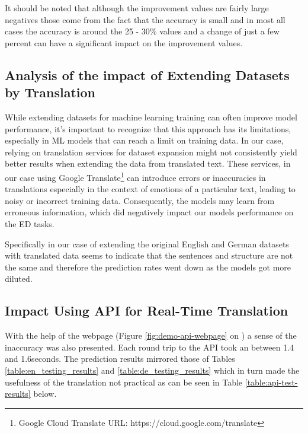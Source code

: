 \documentclass[11pt]{article}
\begin{document}
It should be noted that although the improvement values are fairly large negatives those come from the fact that the accuracy is small and in most all cases the accuracy is around the 25 - 30\% values and a change of just a few percent can have a significant impact on the improvement values.

\subsection{Analysis of the impact of Extending Datasets by Translation}
\label{sec:analysis-of-impact-of-extending-datasets}
While extending datasets for machine learning training can often improve\cite{Sarker2021} model performance, it's important to recognize that this approach has its limitations, especially in ML models that can reach a limit on training data. In our case, relying on translation services for dataset expansion might not consistently yield better results when extending the data from translated text. These services, in our case using Google Translate\footnote{Google Cloud Translate URL: https://cloud.google.com/translate} can introduce errors or inaccuracies in translations especially in the context of emotions of a particular text, leading to noisy or incorrect training data. Consequently, the models may learn from erroneous information, which did negatively impact our models performance on the ED tasks.

Specifically in our case of extending the original English and German datasets with translated data seems to indicate that the sentences and structure are not the same and therefore the prediction rates went down as the models got more diluted.


\subsection{Impact Using API for Real-Time Translation}
\label{sec:impact-using-api-for-real-time-translation}
With the help of the webpage (Figure \ref{fig:demo-api-webpage} on \pageref{fig:demo-api-webpage}) a sense of the inaccuracy was also presented. Each round trip to the API took an between 1.4 and 1.6seconds. The prediction results mirrored those of Tables \ref{table:en_testing_results} and \ref{table:de_testing_results} which in turn made the usefulness of the translation not practical as can be seen in Table \ref{table:api-test-results} below.
\end{document}
